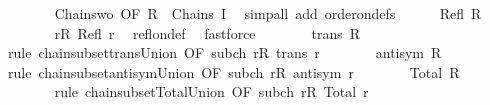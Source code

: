 \begin{isabellebody}
\ \ \ \ \ \ \isamarkupfalse%
\ Chains{\isacharunderscore}{\kern0pt}wo\ {\isacharbrackleft}{\kern0pt}OF\ {\isacartoucheopen}R\ {\isasymin}\ Chains\ I{\isacartoucheclose}{\isacharbrackright}{\kern0pt}\ \isamarkupfalse%
\ {\isacharparenleft}{\kern0pt}simp{\isacharunderscore}{\kern0pt}all\ add{\isacharcolon}{\kern0pt}\ order{\isacharunderscore}{\kern0pt}on{\isacharunderscore}{\kern0pt}defs{\isacharparenright}{\kern0pt}\isanewline
\ \ \ \ \isamarkupfalse%
\ {\isachardoublequoteopen}Refl\ {\isacharparenleft}{\kern0pt}{\isasymUnion}R{\isacharparenright}{\kern0pt}{\isachardoublequoteclose}\isanewline
\ \ \ \ \ \ \isamarkupfalse%
\ {\isacartoucheopen}{\isasymforall}r{\isasymin}R{\isachardot}{\kern0pt}\ Refl\ r{\isacartoucheclose}\ \isamarkupfalse%
\ refl{\isacharunderscore}{\kern0pt}on{\isacharunderscore}{\kern0pt}def\ \isamarkupfalse%
\ fastforce\isanewline
\ \ \ \ \isamarkupfalse%
\ \isamarkupfalse%
\ {\isachardoublequoteopen}trans\ {\isacharparenleft}{\kern0pt}{\isasymUnion}R{\isacharparenright}{\kern0pt}{\isachardoublequoteclose}\isanewline
\ \ \ \ \ \ \isamarkupfalse%
\ {\isacharparenleft}{\kern0pt}rule\ chain{\isacharunderscore}{\kern0pt}subset{\isacharunderscore}{\kern0pt}trans{\isacharunderscore}{\kern0pt}Union\ {\isacharbrackleft}{\kern0pt}OF\ subch\ {\isacartoucheopen}{\isasymforall}r{\isasymin}R{\isachardot}{\kern0pt}\ trans\ r{\isacartoucheclose}{\isacharbrackright}{\kern0pt}{\isacharparenright}{\kern0pt}\isanewline
\ \ \ \ \isamarkupfalse%
\ \isamarkupfalse%
\ {\isachardoublequoteopen}antisym\ {\isacharparenleft}{\kern0pt}{\isasymUnion}R{\isacharparenright}{\kern0pt}{\isachardoublequoteclose}\isanewline
\ \ \ \ \ \ \isamarkupfalse%
\ {\isacharparenleft}{\kern0pt}rule\ chain{\isacharunderscore}{\kern0pt}subset{\isacharunderscore}{\kern0pt}antisym{\isacharunderscore}{\kern0pt}Union\ {\isacharbrackleft}{\kern0pt}OF\ subch\ {\isacartoucheopen}{\isasymforall}r{\isasymin}R{\isachardot}{\kern0pt}\ antisym\ r{\isacartoucheclose}{\isacharbrackright}{\kern0pt}{\isacharparenright}{\kern0pt}\isanewline
\ \ \ \ \isamarkupfalse%
\ \isamarkupfalse%
\ {\isachardoublequoteopen}Total\ {\isacharparenleft}{\kern0pt}{\isasymUnion}R{\isacharparenright}{\kern0pt}{\isachardoublequoteclose}\isanewline
\ \ \ \ \ \ \isamarkupfalse%
\ {\isacharparenleft}{\kern0pt}rule\ chain{\isacharunderscore}{\kern0pt}subset{\isacharunderscore}{\kern0pt}Total{\isacharunderscore}{\kern0pt}Union\ {\isacharbrackleft}{\kern0pt}OF\ subch\ {\isacartoucheopen}{\isasymforall}r{\isasymin}R{\isachardot}{\kern0pt}\ Total\ r{\isacartoucheclose}{\isacharbrackright}{\kern0pt}{\isacharparenright}{\kern0pt}\isanewline

\end{isabellebody}

